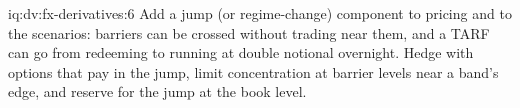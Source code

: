 \begin{solution}{iq:dv:fx-derivatives:6}
Add a jump (or regime-change) component to pricing and to the scenarios: barriers can be crossed without trading near them, and a TARF can go from redeeming
to running at double notional overnight. Hedge with options that pay in the jump, limit concentration at barrier levels near a band's edge, and reserve for the
jump at the book level.
\end{solution}
